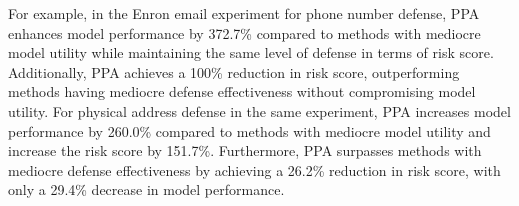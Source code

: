 For example, in the Enron email experiment for phone number defense, PPA enhances model performance by 372.7\% compared to methods with mediocre model utility while maintaining the same level of defense in terms of risk score. Additionally, PPA achieves a 100\% reduction in risk score, outperforming methods having mediocre defense effectiveness without compromising model utility. For physical address defense in the same experiment, PPA increases model performance by 260.0\% compared to methods with mediocre model utility and increase the risk score by 151.7\%. Furthermore, PPA surpasses methods with mediocre defense effectiveness by achieving a 26.2\% reduction in risk score, with only a 29.4\% decrease in model performance.











\begin{comment}
We demonstrate the effectiveness of our method through extensive experiments by fine-tuning on two different datasets: 1) \textbf{Enron email experiment} which fine-tune LLaMA2-7b~\citep{touvron2023llama} and LLaMA3-8b~\citep{dubey2024llama} on Enron email dataset~\citep{klimt2004introducing} 2) \textbf{Fraud email experiment} which fine-tune LLaMA2-7b on Fraud email dataset~\citep{radev2008clair}
\end{comment}

\begin{comment}

1) Pre-trained LLaMA2-7b model~\citep{touvron2023llama} and LLaMA3-8b model~\citep{dubey2024llama}, both fine-tuned using the Enron email dataset~\citep{klimt2004introducing}. 2) Pre-trained LLaMA2-7b model fine-tuned with the fraud email dataset~\citep{radev2008clair}.
\end{comment}

